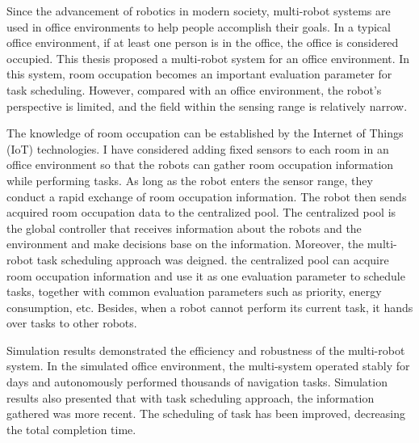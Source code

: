 
Since the advancement of robotics in modern society, multi-robot systems are used in office environments to help people accomplish their goals. In a typical office environment, if at least one person is in the office, the office is considered occupied. This thesis proposed a multi-robot system for an office environment. In this system, room occupation becomes an important evaluation parameter for task scheduling. However, compared with an office environment, the robot's perspective is limited, and the field within the sensing range is relatively narrow.

The knowledge of room occupation can be established by the Internet of Things (IoT) technologies. I have considered adding fixed sensors to each room in an office environment so that the robots can gather room occupation information while performing tasks. As long as the robot enters the sensor range, they conduct a rapid exchange of room occupation information. The robot then sends acquired room occupation data to the centralized pool. The centralized pool is the global controller that receives information about the robots and the environment and make decisions base on the information. 
Moreover, the multi-robot task scheduling approach was deigned. the centralized pool can acquire room occupation information and use it as one evaluation parameter to schedule tasks, together with common evaluation parameters such as priority, energy consumption, etc. Besides, when a robot cannot perform its current task, it hands over tasks to other robots. 

Simulation results demonstrated the efficiency and robustness of the multi-robot system. In the simulated office environment, the multi-system operated stably for days and autonomously performed thousands of navigation tasks. Simulation results also presented that with task scheduling approach, the information gathered was more recent. The scheduling of task has been improved, decreasing the total completion time.

\cleardoublepage
